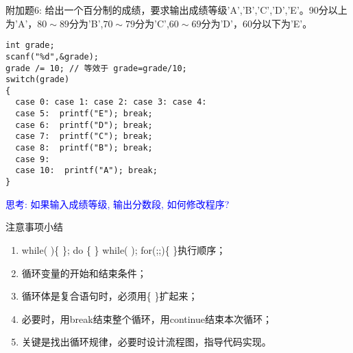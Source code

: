 \begin{frame}
附加题6: 给出一个百分制的成绩，要求输出成绩等级'A','B','C','D','E'。90分以上为'A'，$80\sim 89$分为'B',$70\sim 79$分为'C',$60\sim 69$分为'D'，60分以下为'E'。
\begin{lstlisting}
int grade;
scanf("%d",&grade);
grade /= 10; // 等效于 grade=grade/10;
switch(grade)
{
  case 0: case 1: case 2: case 3: case 4: 
  case 5:  printf("E"); break;
  case 6:  printf("D"); break;
  case 7:  printf("C"); break;
  case 8:  printf("B"); break;
  case 9:
  case 10:  printf("A"); break;
}
\end{lstlisting}
\pause
\textcolor{blue}{思考: 如果输入成绩等级, 输出分数段, 如何修改程序? }
\end{frame}

\begin{frame}{注意事项小结}
\begin{enumerate}
\setlength{\itemsep}{.5cm}
\item while( )\{ \}; do \{ \} while( ); for(;;)\{ \}执行顺序；
\item 循环变量的开始和结束条件；
\item 循环体是复合语句时，必须用\{ \}扩起来；
\item 必要时，用break结束整个循环，用continue结束本次循环；
\item 关键是找出循环规律，必要时设计流程图，指导代码实现。	
\end{enumerate}
\end{frame}